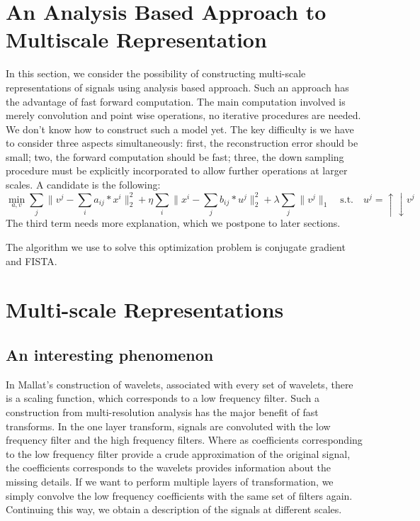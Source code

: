 \documentclass[a4paper]{article}
\begin{document}
{{\section{An Analysis Based Approach to Multiscale Representation}
In this section, we consider the possibility of constructing multi-scale representations of signals using analysis based approach. Such an approach has the advantage of fast forward computation. The main computation involved is merely convolution and point wise operations, no iterative procedures are needed. We don't know how to construct such a model yet. The key difficulty is we have to consider three aspects simultaneously: first,  the reconstruction error should be small; two, the forward computation should be fast; three, the down sampling procedure must be explicitly incorporated to allow further operations at larger scales. A candidate is the following:
\begin{equation}
	\min_{a,v}{\sum_{j} \|v^j-\sum_{i} a_{ij}*x^i\|_2^2} + \eta \sum_{i} \|x^i-\sum_{j} b_{ij}*u^j\|_2^2+\lambda \sum_j\|v^j\|_1\quad \textrm{s.t.} \quad u^j=\uparrow\downarrow v^j
\end{equation}
The third term needs more explanation, which we postpone to later sections. 

The algorithm we use to solve this optimization problem is conjugate gradient and FISTA.
}

\newpage
\section{Multi-scale Representations}
\subsection{An interesting phenomenon}
In Mallat's construction of wavelets, associated with every set of wavelets, there is a scaling function, which corresponds to a low frequency filter. Such a construction from multi-resolution analysis has the major benefit of fast transforms. In the one layer transform, signals are convoluted with the low frequency filter and the high frequency filters. Where as coefficients corresponding to the low frequency filter provide a crude approximation of the original signal, the coefficients corresponds to the wavelets provides information about the missing details. If we want to perform multiple layers of transformation, we simply convolve the low frequency coefficients with the same set of filters again. Continuing this way, we obtain a description of the signals at different scales. 

}
\end{document}
